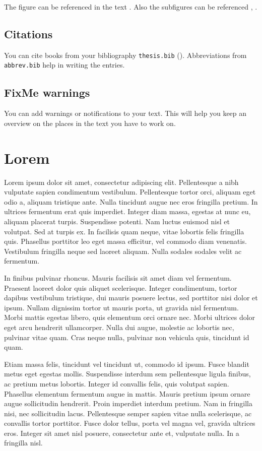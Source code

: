 The figure can be referenced in the text \eg{}.
Also the subfigures can be referenced \eg{}, .

\subsection{Citations} %
\label{sub:citations}
You can cite books from your bibliography \texttt{thesis.bib} (\eg \cite{cochrane}).
Abbreviations from \texttt{abbrev.bib} help in writing the entries.

\subsection{FixMe warnings}
\label{sub:fixme}
You can add warnings or notifications to your text.
This will help you keep an overview on the places in the text you have to work on.

\section{Lorem}
\label{sec:lorem}
Lorem ipsum dolor sit amet, consectetur adipiscing elit. Pellentesque a nibh vulputate sapien condimentum vestibulum. Pellentesque tortor orci, aliquam eget odio a, aliquam tristique ante. Nulla tincidunt augue nec eros fringilla pretium. In ultrices fermentum erat quis imperdiet. Integer diam massa, egestas at nunc eu, aliquam placerat turpis. Suspendisse potenti. Nam luctus euismod nisl et volutpat. Sed at turpis ex. In facilisis quam neque, vitae lobortis felis fringilla quis. Phasellus porttitor leo eget massa efficitur, vel commodo diam venenatis. Vestibulum fringilla neque sed laoreet aliquam. Nulla sodales sodales velit ac fermentum.

In finibus pulvinar rhoncus. Mauris facilisis sit amet diam vel fermentum. Praesent laoreet dolor quis aliquet scelerisque. Integer condimentum, tortor dapibus vestibulum tristique, dui mauris posuere lectus, sed porttitor nisi dolor et ipsum. Nullam dignissim tortor ut mauris porta, ut gravida nisl fermentum. Morbi mattis egestas libero, quis elementum orci ornare nec. Morbi ultrices dolor eget arcu hendrerit ullamcorper. Nulla dui augue, molestie ac lobortis nec, pulvinar vitae quam. Cras neque nulla, pulvinar non vehicula quis, tincidunt id quam.

Etiam massa felis, tincidunt vel tincidunt ut, commodo id ipsum. Fusce blandit metus eget egestas mollis. Suspendisse interdum sem pellentesque ligula finibus, ac pretium metus lobortis. Integer id convallis felis, quis volutpat sapien. Phasellus elementum fermentum augue in mattis. Mauris pretium ipsum ornare augue sollicitudin hendrerit. Proin imperdiet interdum pretium. Nam in fringilla nisi, nec sollicitudin lacus. Pellentesque semper sapien vitae nulla scelerisque, ac convallis tortor porttitor. Fusce dolor tellus, porta vel magna vel, gravida ultrices eros. Integer sit amet nisl posuere, consectetur ante et, vulputate nulla. In a fringilla nisl.

